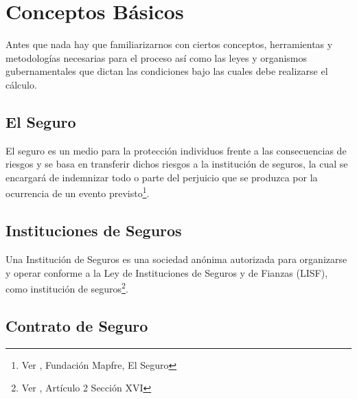 \documentclass[11pt,twoside,openright,spanish]{report}
\numberwithin{equation}{chapter}
\numberwithin{figure}{chapter}
\numberwithin{table}{chapter}
\renewcommand{\footrulewidth}{0pt}
\renewcommand{\headrulewidth}{0.1pt}
\begin{document}
	
	\fancypagestyle{plain}{
		\fancyhead[L]{}
		\fancyhead[C]{}
		\fancyhead[R]{}
		
		\fancyfoot[L]{}
		\fancyfoot[C]{\thepage}
		\fancyfoot[R]{}
		\renewcommand{\headrulewidth}{0pt}
		\renewcommand{\footrulewidth}{0pt}
	}
	
	\fancyhead[LE]{\scshape\thepage\hspace{1cm}\footnotesize\nouppercase{\leftmark}}
	\fancyhead[LO]{}
	\fancyhead[RE]{}
	\pagestyle{fancy}
	\cleardoublepage


	\chapter{Conceptos Básicos}

Antes que nada hay que familiarizarnos con ciertos conceptos, herramientas y metodologías necesarias para el proceso así como las leyes y organismos gubernamentales que dictan las condiciones bajo las cuales debe realizarse el cálculo.

	\section{El Seguro}
	El seguro es un medio para la protección individuos frente a las consecuencias de riesgos y se basa en transferir dichos riesgos a la institución de seguros, la cual se encargará de indemnizar todo o parte del perjuicio que se produzca por la ocurrencia de un evento previsto\footnote{Ver \citet{ASeguro}, Fundación Mapfre, El Seguro}.
	
	\section{Instituciones de Seguros}

	Una Institución de Seguros es una sociedad anónima autorizada para organizarse y operar conforme a la Ley de Instituciones de Seguros y de Fianzas (LISF), como institución de seguros\footnote{Ver \citet{BAseguradora}, Artículo 2 Sección XVI}.

 
	
	\section{Contrato de Seguro}
	
\end{document}
